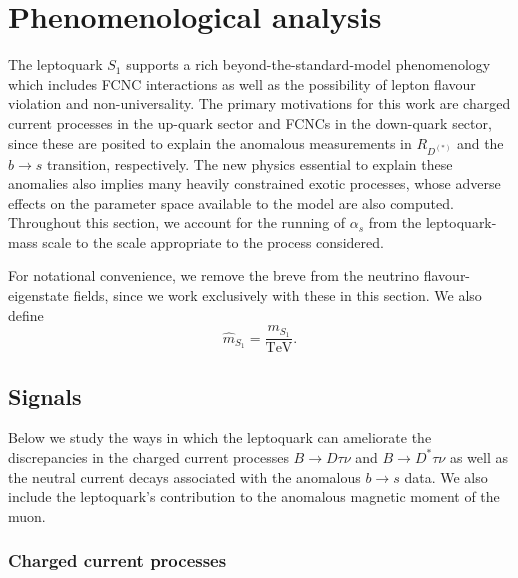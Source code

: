 \section{Phenomenological analysis}
\label{sec:ch3-phenomenologicalanalysis}

The leptoquark $S_{1}$ supports a rich beyond-the-standard-model phenomenology
which includes FCNC interactions as well as the possibility of lepton flavour
violation and non-universality. The primary motivations for this work are
charged current processes in the up-quark sector and FCNCs in the down-quark
sector, since these are posited to explain the anomalous measurements in
$R_{D^{(*)}}$ and the $b \to s$ transition, respectively. The new physics
essential to explain these anomalies also implies many heavily constrained
exotic processes, whose adverse effects on the parameter space available to the
model are also computed. Throughout this section, we account for the running of
$\alpha_s$ from the leptoquark-mass scale to the scale appropriate to the
process considered.

For notational convenience, we remove the breve from the neutrino
flavour-eigenstate fields, since we work exclusively with these in this section.
We also define
\begin{equation}
  \hat{m}_{S_{1}} = \frac{m_{S_{1}}}{\text{TeV}}.
\end{equation}

\subsection{Signals}
\label{sec:ch3-signals}

Below we study the ways in which the leptoquark can ameliorate the discrepancies
in the charged current processes ${B} \to D \tau \nu$ and $B \to D^* \tau \nu$
as well as the neutral current decays associated with the anomalous $b \to s$
data. We also include the leptoquark's contribution to the anomalous magnetic
moment of the muon.

\subsubsection{Charged current processes}
\label{sec:ch3-chargedcurrentprocesses}

